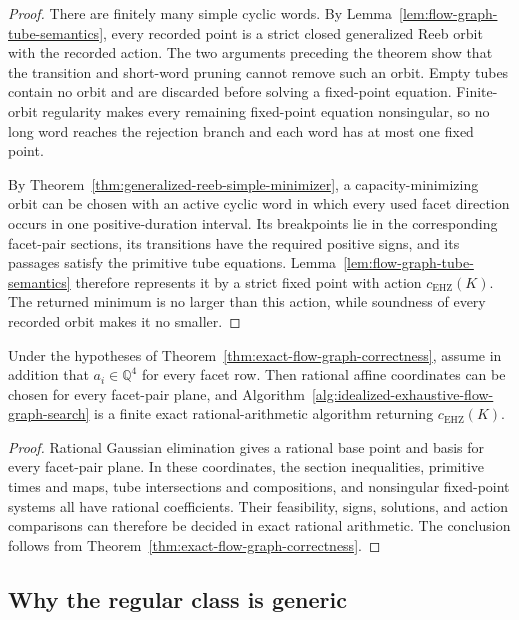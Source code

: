 \begin{proof}
There are finitely many simple cyclic words.  By
Lemma~\ref{lem:flow-graph-tube-semantics}, every recorded point is a strict
closed generalized Reeb orbit with the recorded action.  The two arguments
preceding the theorem show that the transition and short-word pruning cannot
remove such an orbit. Empty tubes contain no orbit and are discarded before
solving a fixed-point equation. Finite-orbit regularity makes every remaining
fixed-point equation nonsingular, so no long word reaches the rejection
branch and each word has at most one fixed point.

By Theorem~\ref{thm:generalized-reeb-simple-minimizer}, a capacity-minimizing
orbit can be chosen with an active cyclic word in which every used facet
direction occurs in one positive-duration interval.  Its breakpoints lie in
the corresponding facet-pair sections, its transitions have the required
positive signs, and its passages satisfy the primitive tube equations.
Lemma~\ref{lem:flow-graph-tube-semantics} therefore represents it by a strict
fixed point with action \(c_{\mathrm{EHZ}}(K)\).  The returned minimum is no
larger than this action, while soundness of every recorded orbit makes it no
smaller.
\end{proof}

\begin{corollary}
\label{cor:rational-flow-graph-correctness}
Under the hypotheses of
Theorem~\ref{thm:exact-flow-graph-correctness}, assume in addition that
\(a_i\in\mathbb Q^4\) for every facet row.  Then rational affine coordinates
can be chosen for every facet-pair plane, and
Algorithm~\ref{alg:idealized-exhaustive-flow-graph-search} is a finite exact
rational-arithmetic algorithm returning \(c_{\mathrm{EHZ}}(K)\).
\end{corollary}

\begin{proof}
Rational Gaussian elimination gives a rational base point and basis for every
facet-pair plane.  In these coordinates, the section inequalities, primitive
times and maps, tube intersections and compositions, and nonsingular
fixed-point systems all have rational coefficients.  Their feasibility, signs,
solutions, and action comparisons can therefore be decided in exact rational
arithmetic.  The conclusion follows from
Theorem~\ref{thm:exact-flow-graph-correctness}.
\end{proof}

\subsection{Why the regular class is generic}
\label{subsec:flow-graph-algorithm-ch2021-genericity}

